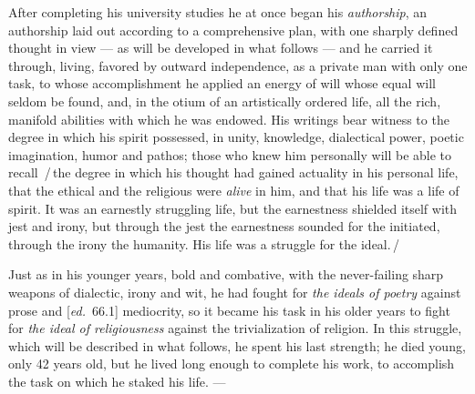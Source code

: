 \documentclass[12pt,a4paper,openany]{book}
\newcommand{\ed}[1]{{\small[\textit{ed.}\ #1]}}
\newcommand{\ins}[1]{\,/\,#1\,/\,}
\begin{document}
After completing his university studies he at once began his
\emph{authorship}, an authorship laid out according to a comprehensive plan,
with one sharply defined thought in view --- as will be developed in what
follows --- and he carried it through, living, favored by outward independence,
as a private man with only one task, to whose accomplishment he applied an
energy of will whose equal will seldom be found, and, in the otium of an
artistically ordered life, all the rich, manifold abilities with which he was
endowed. His writings bear witness to the degree in which his spirit possessed,
in unity, knowledge, dialectical power, poetic imagination, humor and pathos;
those who knew him personally will be able to recall \ins{the degree in which
his thought had gained actuality in his personal life, that the ethical and the
religious were \emph{alive} in him, and that his life was a life of spirit. It
was an earnestly struggling life, but the earnestness shielded itself with jest
and irony, but through the jest the earnestness sounded for the initiated,
through the irony the humanity. His life was a struggle for the ideal.}

Just as in his younger years, bold and combative, with the never-failing sharp
weapons of dialectic, irony and wit, he had fought for \emph{the ideals of
poetry} against prose and \ed{66.1} mediocrity, so it became his task in his
older years to fight for \emph{the ideal of religiousness} against the
trivialization of religion. In this struggle, which will be described in what
follows, he spent his last strength; he died young, only 42 years old, but he
lived long enough to complete his work, to accomplish the task on which he
staked his life. ---
\end{document}
